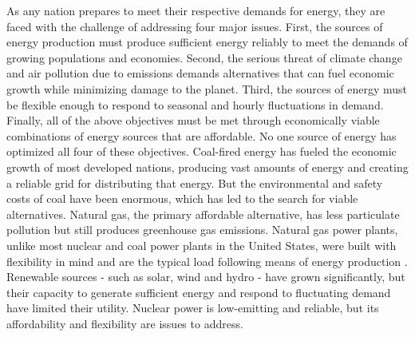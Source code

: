 As any nation prepares to meet their respective demands for energy, they are faced with the challenge of addressing four major issues. First, the sources of energy production must produce sufficient energy reliably to meet the demands of growing populations and economies. Second, the serious threat of climate change and air pollution due to emissions demands alternatives that can fuel economic growth while minimizing damage to the planet. Third, the sources of energy must be flexible enough to respond to seasonal and hourly fluctuations in demand. Finally, all of the above objectives must be met through economically viable combinations of energy sources that are affordable.
No one source of energy has optimized all four of these objectives. Coal-fired energy has fueled the economic growth of most developed nations, producing vast amounts of energy and creating a reliable grid for distributing that energy. But the environmental and safety costs of coal have been enormous, which has led to the search for viable alternatives. Natural gas, the primary affordable alternative, has less particulate pollution but still produces greenhouse gas emissions. Natural gas power plants, unlike most nuclear and coal power plants in the United States, were built with flexibility in mind and are the typical load following means of energy production \cite{MITEnergyInitiative2011}. Renewable sources - such as solar, wind and hydro - have grown significantly, but their capacity to generate sufficient energy and respond to fluctuating demand have limited their utility. Nuclear power is low-emitting and reliable, but its affordability and flexibility are issues to address.

